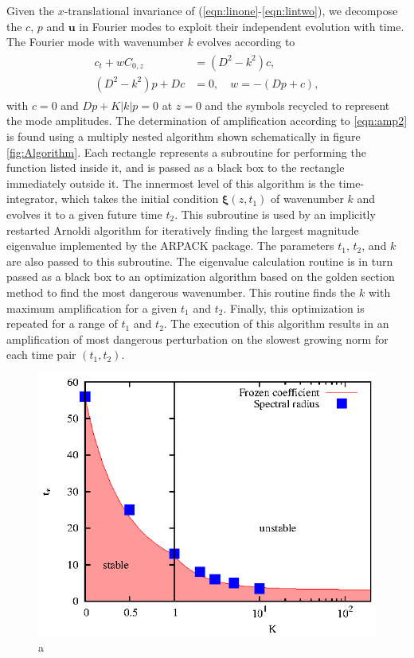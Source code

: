 \documentclass[letterpaper,10pt,prl,twocolumn,aps,reprint,superscriptaddress]{revtex4-1}
\newcommand{\bu}{\boldsymbol{u}}
\newcommand{\prt}{\boldsymbol{\xi}}
\begin{document}
Given the $x$-translational invariance of (\ref{eqn:linone}-\ref{eqn:lintwo}), we decompose the $c$, $p$ and $\bu$ in Fourier modes to exploit their independent evolution with time. 
The Fourier mode with wavenumber $k$ evolves according to
\begin{align}
\begin{split}
 c_t + w C_{0,z} &= (D^2-k^2) c,  \\
(D^2-k^2)p + Dc &= 0, \quad w = -(Dp + c),
\end{split}
\end{align}
with $c=0$ and $Dp + K|k| p =0$ at $z=0$ and the symbols recycled to represent the mode amplitudes. 
The determination of amplification according to \eqref{eqn:amp2} is found using a multiply nested algorithm shown schematically in figure \ref{fig:Algorithm}. 
Each rectangle represents a subroutine for performing the function listed inside it, and is passed as a black box to the rectangle immediately outside it.
The innermost level of this algorithm is the time-integrator, which takes the initial condition $\prt(z, t_1)$ of wavenumber $k$ and evolves it to a given future time $t_2$. 
This subroutine is used by an implicitly restarted Arnoldi algorithm for iteratively finding the largest magnitude eigenvalue implemented by the ARPACK package\cite{lehoucq1998arpack}. 
The parameters $t_1$, $t_2$, and $k$ are also passed to this subroutine. 
The eigenvalue calculation routine is in turn passed as a black box to an optimization algorithm based on the golden section method to find the most dangerous wavenumber. 
This routine finds the $k$ with maximum amplification for a given $t_1$ and $t_2$. 
Finally, this optimization is repeated for a range of $t_1$ and $t_2$. 
The execution of this algorithm results in an amplification of most dangerous perturbation on the slowest growing norm for each time pair $(t_1, t_2)$. 

\begin{figure}
 \centering
 \includegraphics{./Figures/Frozen.eps}
 \caption{a}
 \label{fig:Frozen}
\end{figure}
\end{document}
